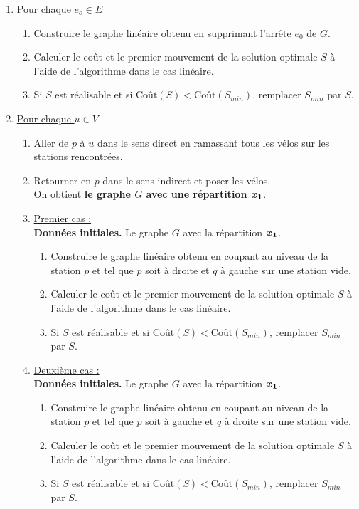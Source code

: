 \begin{enumerate}
\item \uline{Pour chaque $e_o \in E$}\label{Ze0 nul}
  \begin{enumerate}
  \item Construire le graphe linéaire obtenu en supprimant l'arrête $e_0$ de $G$.
  \item Calculer le coût et le premier mouvement de la solution optimale $S$ à l'aide de l'algorithme dans le cas linéaire.
  \item Si $S$ est réalisable et si $\mbox{Coût}(S) < \mbox{Coût}(S_{min})$, remplacer $S_{min}$ par $S$.
  \end{enumerate}
\item \uline{Pour chaque $u \in V$}\label{Ze0 unitaire}
  \begin{enumerate}
  \item Aller de $p$ à $u$ dans le sens direct en ramassant tous les vélos sur les stations rencontrées.
  \item Retourner en $p$ dans le sens indirect et poser les vélos.\\
    On obtient \textbf{le graphe $G$ avec une répartition $\boldsymbol{x_1}$}.
  \item \uline{Premier cas :}\\
    \textbf{Données initiales.} Le graphe $G$ avec la répartition $\boldsymbol{x_1}$.
    \begin{enumerate}
    \item Construire le graphe linéaire obtenu en coupant au niveau de la station $p$ et tel que $p$ soit à droite et $q$ à gauche sur une station vide.
    \item Calculer le coût et le premier mouvement de la solution optimale $S$ à l'aide de l'algorithme dans le cas linéaire.
    \item Si $S$ est réalisable et si $\mbox{Coût}(S) < \mbox{Coût}(S_{min})$, remplacer $S_{min}$ par $S$.
    \end{enumerate}
  \item \uline{Deuxième cas :}\\
    \textbf{Données initiales.} Le graphe $G$ avec la répartition $\boldsymbol{x_1}$.
    \begin{enumerate}
    \item Construire le graphe linéaire obtenu en coupant au niveau de la station $p$ et tel que $p$ soit à gauche et $q$ à droite sur une station vide.
    \item Calculer le coût et le premier mouvement de la solution optimale $S$ à l'aide de l'algorithme dans le cas linéaire.
    \item Si $S$ est réalisable et si $\mbox{Coût}(S) < \mbox{Coût}(S_{min})$, remplacer $S_{min}$ par $S$.
    \end{enumerate}
  \end{enumerate}
\end{enumerate}

